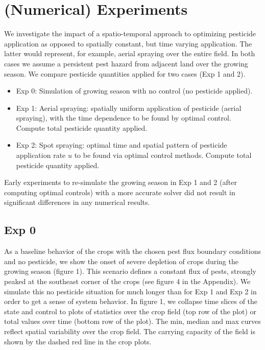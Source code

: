 \documentclass[11pt]{article}
\begin{document}
\section{(Numerical) Experiments}

We investigate the impact of a spatio-temporal approach to optimizing pesticide application as opposed to spatially constant, but time varying application. The latter would represent, for example, aerial spraying over the entire field. In both cases we assume a persistent pest hazard from adjacent land over the growing season. We compare pesticide quantities applied for two cases (Exp 1 and 2).

\begin{itemize}
	\setlength\itemsep{-1pt}
	\item Exp 0: Simulation of growing season with no control (no pesticide applied).
	\item Exp 1: Aerial spraying: spatially uniform application of pesticide (aerial spraying), with the time dependence to be found by optimal control. Compute total pesticide quantity applied.
	\item Exp 2: Spot spraying: optimal time and spatial pattern of pesticide application rate $u$ to be found via optimal control methods. Compute total pesticide quantity applied.
\end{itemize}

Early experiments to re-simulate the growing season in Exp 1 and 2 (after computing optimal controls) with a more accurate solver did not result in significant differences in any numerical results.

\subsection{Exp 0}

As a baseline behavior of the crops with the chosen pest flux boundary conditions and no pesticide, we show the onset of severe depletion of crops during the growing season (figure 1). This scenario defines a constant flux of pests, strongly peaked at the southeast corner of the crops (see figure 4 in the Appendix). We simulate this no pesticide situation for much longer than for Exp 1 and Exp 2 in order to get a sense of system behavior. In figure 1, we collapse time slices of the state and control to plots of statistics over the crop field (top row of the plot) or total values over time (bottom row of the plot). The min, median and max curves reflect spatial variability over the crop field. The carrying capacity of the field is shown by the dashed red line in the crop plots.
\end{document}
